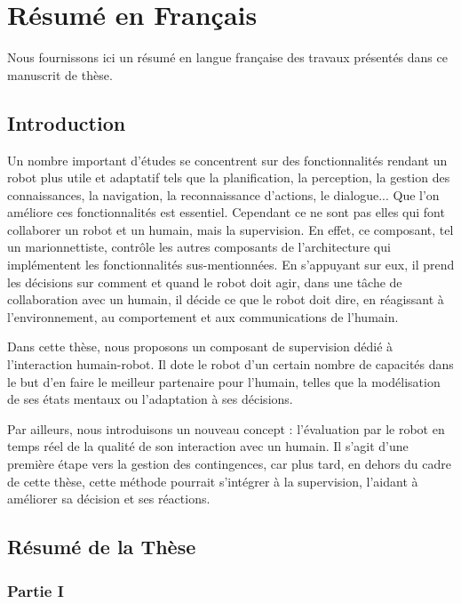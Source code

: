 \chapter{Résumé en Français}
Nous fournissons ici un résumé en langue française des travaux présentés dans ce manuscrit de thèse.

\section*{Introduction}
Un nombre important d'études se concentrent sur des fonctionnalités rendant un robot plus utile et adaptatif tels que la planification, la perception, la gestion des connaissances, la navigation, la reconnaissance d'actions, le dialogue... Que l'on améliore ces fonctionnalités est essentiel. Cependant ce ne sont pas elles qui font collaborer un robot et un humain, mais la supervision. En effet, ce composant, tel un marionnettiste, contrôle les autres composants de l'architecture qui implémentent les fonctionnalités sus-mentionnées. En s'appuyant sur eux, il prend les décisions sur comment et quand le robot doit agir, dans une tâche de collaboration avec un humain, il décide ce que le robot doit dire, en réagissant à l'environnement, au comportement et aux communications de l'humain. 

Dans cette thèse, nous proposons un composant de supervision dédié à l'interaction humain-robot. Il dote le robot d'un certain nombre de capacités dans le but d'en faire le meilleur partenaire pour l'humain, telles que la modélisation de ses états mentaux ou l'adaptation à ses décisions. 

Par ailleurs, nous introduisons un nouveau concept : l'évaluation par le robot en temps réel de la qualité de son interaction avec un humain. Il s'agit d'une première étape vers la gestion des contingences, car plus tard, en dehors du cadre de cette thèse, cette méthode pourrait s'intégrer à la supervision, l'aidant à améliorer sa décision et ses réactions.

                                        
\section*{Résumé de la Thèse}

\subsection*{Partie I}

